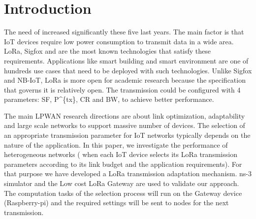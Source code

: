 \section{Introduction} \label{sec:Introduction}

The need of  increased significantly these five last years.
The main factor is that IoT devices require low power consumption to transmit data in a wide area.
LoRa,
	Sigfox and  are the most known technologies that satisfy these requirements.
Applications like smart building and smart environment are one of hundreds use cases that need to be deployed with such technologies.
Unlike Sigfox and NB-IoT,
	LoRa is more open for academic research because the specification that governs it is relatively open.
The transmission could be configured with 4 parameters:
	\ac{SF},
	\ac{P^{tx}},
	\ac{CR} and \ac{BW},
	to achieve better performance.

The main LPWAN research directions are about link optimization,
	adaptability and large scale networks to support massive number of devices.
The selection of an appropriate transmission parameter for IoT networks typically depends on the nature of the application.
In this paper,
	we investigate the performance of heterogeneous networks (\ie\red{,}
when each IoT device selects its LoRa transmission parameters according to its link budget and the application requirements).
For that purpose\red{,} we have developed a LoRa transmission adaptation mechanism.
 ns-3 simulator and the Low cost LoRa Gateway \cite{lowcostloragateway} are used to validate our approach.
The computation tasks of the selection process will run on the Gateway device (Raspberry-pi) and the required settings will be sent to nodes for the next transmission.

